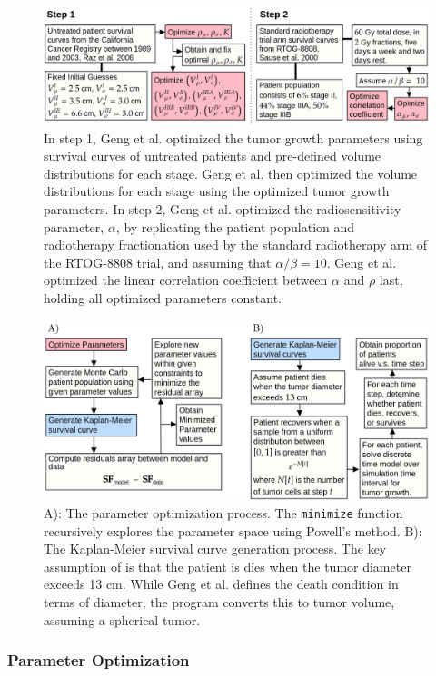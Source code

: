 \documentclass[letterpaper
, superscriptaddress
, twocolumn
, aps
]{revtex4}
\begin{document}
\begin{figure}
	\centering
	\includegraphics[scale=0.27]{Figures/param_estimation.png}
	\caption{In step 1, Geng et al. optimized the tumor growth parameters using survival curves of untreated patients and pre-defined volume distributions for each stage. Geng et al. then optimized the volume distributions for each stage using the optimized tumor growth parameters. In step 2, Geng et al. optimized the radiosensitivity parameter, $\alpha$, by replicating the patient population and radiotherapy fractionation used by the standard radiotherapy arm of the RTOG-8808 trial, and assuming that $\alpha/\beta = 10$. Geng et al. optimized the linear correlation coefficient between $\alpha$ and $\rho$ last, holding all optimized parameters constant.}
	\label{param_estimation}
\end{figure}
\begin{figure}
	\centering
	\includegraphics[scale=0.26]{Figures/kaplan_mini.png}
	\caption{A): The parameter optimization process. The \texttt{minimize} function recursively explores the parameter space using Powell's method. B): The Kaplan-Meier survival curve generation process. The key assumption of is that the patient is dies when the tumor diameter exceeds 13 cm. While Geng et al. defines the death condition in terms of diameter, the program converts this to tumor volume, assuming a spherical tumor.}
	\label{kaplan_mini}
\end{figure}

\subsubsection{Parameter Optimization}
\end{document}
